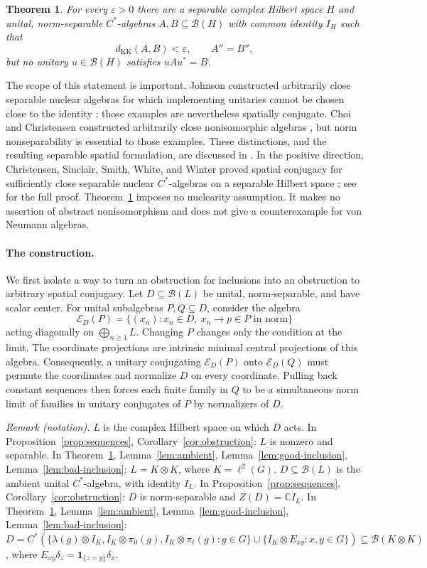 \documentclass[11pt]{article}
\newtheorem{theorem}{Theorem}[section]
\theoremstyle{definition}
\theoremstyle{remark}
\newcommand{\C}{\mathbb C}
\newcommand{\B}{\mathcal B}
\newcommand{\E}{\mathcal E}
\newcommand{\KK}{d_{\mathrm{KK}}}
\newcommand{\id}{I}
\begin{document}
\begin{theorem}\label{thm:main}
For every $\varepsilon>0$ there are a separable complex Hilbert space $H$
and unital, norm-separable $C^*$-algebras $A,B\subseteq\B(H)$ with common
identity $\id_H$ such that
\[
\KK(A,B)<\varepsilon,\qquad A''=B'',
\]
but no unitary $u\in\B(H)$ satisfies $uAu^*=B$.
\end{theorem}

The scope of this statement is important. Johnson constructed arbitrarily
close separable nuclear algebras for which implementing unitaries cannot be
chosen close to the identity \cite{Johnson82}; those examples are nevertheless
spatially conjugate. Choi and Christensen constructed arbitrarily close
nonisomorphic algebras \cite{CC83}, but norm nonseparability is essential to
those examples. These distinctions, and the resulting separable spatial
formulation, are discussed in \cite{CSSWW10}. In the positive direction,
Christensen, Sinclair, Smith, White, and Winter proved spatial conjugacy for
sufficiently close separable nuclear $C^*$-algebras on a separable Hilbert
space \cite[Theorem~4]{CSSWW10}; see \cite[Theorem~5.4]{CSSWW12} for the full
proof. Theorem~\ref{thm:main} imposes no nuclearity
assumption. It makes no assertion of abstract nonisomorphism and does not
give a counterexample for von Neumann algebras.

\paragraph{The construction.}
We first isolate a way to turn an obstruction for inclusions into an
obstruction to arbitrary spatial conjugacy. Let $D\subseteq\B(L)$ be unital,
norm-separable, and have scalar center. For unital subalgebras $P,Q\subseteq D$,
consider the algebra
\[
\E_D(P)=\{(x_n):x_n\in D,\ x_n\longrightarrow p\in P
\text{ in norm}\}
\]
acting diagonally on $\bigoplus_{n\ge1}L$. Changing $P$ changes only the
condition at the limit. The coordinate projections are intrinsic minimal
central projections of this algebra. Consequently, a unitary conjugating
$\E_D(P)$ onto $\E_D(Q)$ must permute the coordinates and normalize $D$
on every coordinate. Pulling back constant sequences then forces each
finite family in $Q$ to be a simultaneous norm limit of families in
unitary conjugates of $P$ by normalizers of $D$.

\noindent\textit{Remark (notation).} $L$ is the complex Hilbert space on which $D$ acts. In Proposition~\ref{prop:sequences}, Corollary~\ref{cor:obstruction}: $L$ is nonzero and separable. In Theorem~\ref{thm:main}, Lemma~\ref{lem:ambient}, Lemma~\ref{lem:good-inclusion}, Lemma~\ref{lem:bad-inclusion}: $L=K\otimes K$, where $K=\ell^2(G)$. $D\subseteq\B(L)$ is the ambient unital $C^*$-algebra, with identity $\id_L$. In Proposition~\ref{prop:sequences}, Corollary~\ref{cor:obstruction}: $D$ is norm-separable and $Z(D)=\C\id_L$. In Theorem~\ref{thm:main}, Lemma~\ref{lem:ambient}, Lemma~\ref{lem:good-inclusion}, Lemma~\ref{lem:bad-inclusion}: $D=C^*(\{\lambda(g)\otimes\id_K,\id_K\otimes\pi_0(g),\id_K\otimes\pi_t(g):g\in G\}\cup\{\id_K\otimes E_{xy}:x,y\in G\})\subseteq\B(K\otimes K)$, where $E_{xy}\delta_z=\mathbf1_{\{z=y\}}\delta_x$.
\end{document}
